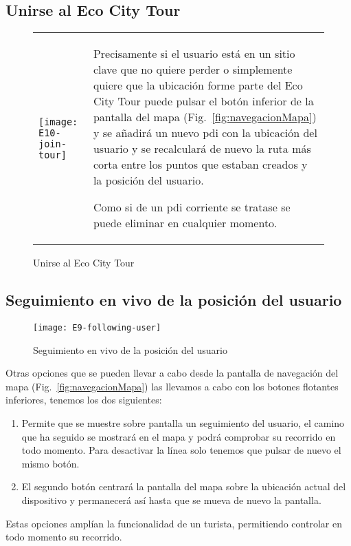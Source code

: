 \subsection{Unirse al Eco City Tour}
\begin{figure}[H]
	\centering
	\begin{tabular}{m{} m{}}
		\texttt{[image: E10-join-tour]} & 
		\vspace{-10pt}
		Precisamente si el usuario está en un sitio clave que no quiere perder o simplemente quiere que la ubicación forme parte del Eco City Tour puede pulsar el botón inferior de la pantalla del mapa (Fig.~\ref{fig:navegacionMapa}) y se añadirá un nuevo \acrshort{pdi} con la ubicación del usuario y se recalculará de nuevo la ruta más corta entre los puntos que estaban creados y la posición del usuario.
		
		Como si de un \acrlong{pdi} corriente se tratase se puede eliminar en cualquier momento.
	\end{tabular}
	\caption{Unirse al Eco City Tour}
	\label{fig:joinECT}
\end{figure}

\subsection{Seguimiento en vivo de la posición del usuario}
\begin{figure}[H]
	\centering
	\texttt{[image: E9-following-user]} 
	\caption{Seguimiento en vivo de la posición del usuario}
	\label{fig:followingUser}
	\vspace{-10pt}
\end{figure}

Otras opciones que se pueden llevar a cabo desde la pantalla de navegación del mapa (Fig.~\ref{fig:navegacionMapa}) las llevamos a cabo con los botones flotantes inferiores, tenemos los dos siguientes:
		
\begin{enumerate}
	\item Permite que se muestre sobre pantalla un seguimiento del usuario, el camino que ha seguido se mostrará en el mapa y podrá comprobar su recorrido en todo momento. Para desactivar la línea solo tenemos que pulsar de nuevo el mismo botón.
	\item El segundo botón centrará la pantalla del mapa sobre la ubicación actual del dispositivo y permanecerá así hasta que se mueva de nuevo la pantalla.
\end{enumerate}		

Estas opciones amplían la funcionalidad de un turista, permitiendo controlar en todo momento su recorrido.






